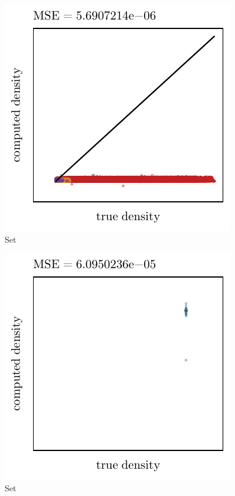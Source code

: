 \begin{subfigure}{0.3\textwidth}
	\centering
	\includegraphics[keepaspectratio=true, width=\textwidth, height=0.23\textheight]{4/img/results_ferdosi_3_120000_sambe_breiman.pdf}
	\caption{Set \ferdosiThree}
	\label{fig:4:simulated:datasets:sambe:ferdosi3}
\end{subfigure}	
\begin{subfigure}{0.3\textwidth}
	\centering
	\includegraphics[keepaspectratio=true, width=\textwidth, height=0.23\textheight]{4/img/results_baakman_4_60000_sambe_breiman.pdf}
	\caption{Set \baakmanFour}
	\label{fig:4:simulated:datasets:sambe:baakman4}
\end{subfigure}	
